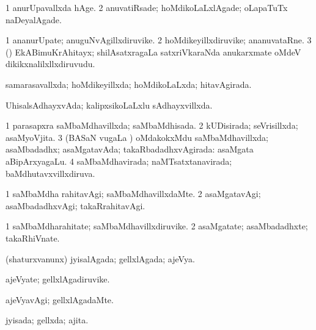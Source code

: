 {\bentry
{} 
\gl{\kirxvi}
\expl{}
\bmng
\bnum
\num{1} anurUpavallxda hAge. 
\num{2} anuvatiRsade; hoMdikoLaLxlAgade; oLapaTuTx naDeyalAgade. 
\enum
\emng
\eentry

\bentry
{} 
\gl{\nA}
\expl{}
\bmng
\bnum
\num{1} ananurUpate; anuguNvAgillxdiruvike. 
\num{2} hoMdikeyillxdiruvike; ananuvataRne. 
\num{3} (\BUvi) EkABimuKrAhitayx; shilAsatxragaLa satxriVkaraNda anukarxmate oMdeV dikikxnalilxllxdiruvudu. 
\enum
\emng
\eentry

\bentry
{} 
\gl{\gu}
\expl{}
\bmng
 samarasavallxda; hoMdikeyillxda; hoMdikoLaLxda; hitavAgirada. 
\emng
\eentry

\bentry
{} 
\gl{\gu}
\expl{}
\bmng
UhisalsAdhayxvAda; kalipxsikoLaLxlu sAdhayxvillxda. 
\emng
\eentry

\bentry
{} 
\gl{\gu}
\expl{}
\bmng
\bnum
\num{1} parasapxra saMbaMdhavillxda; saMbaMdhisada. 
\num{2} kUDisirada; seVrisillxda; asaMyoVjita. 
\num{3} (BASaN \mo vugaLa \vi) oMdakokxMdu saMbaMdhavillxda; asaMbadadhx; asaMgatavAda; takaRbadadhxvAgirada:  asaMgata aBipArxyagaLu. 
\num{4} saMbaMdhavirada; naMTsatxtanavirada; baMdhutavxvillxdiruva. 
\enum
\emng
\eentry

\bentry
{} 
\gl{\kirxvi}
\expl{}
\bmng
\bnum
\num{1} saMbaMdha rahitavAgi; saMbaMdhavillxdaMte. 
\num{2} asaMgatavAgi; asaMbadadhxvAgi; takaRrahitavAgi. 
\enum
\emng
\eentry


\bentry
{} 
\gl{\nA}
\expl{}
\bmng
\bnum
\num{1} saMbaMdharahitate; saMbaMdhavillxdiruvike. 
\num{2} asaMgatate; asaMbadadhxte; takaRhiVnate. 
\enum
\emng
\eentry

\bentry
{} 
\gl{\gu}
\expl{}
\bmng
 (shaturxvanunx) jyisalAgada; gellxlAgada; ajeVya. 
\emng
\eentry

\bentry
{} 
\gl{\nA}
\expl{}
\bmng
 ajeVyate; gellxlAgadiruvike. 
\emng
\eentry

\bentry
{} 
\gl{\kirxvi}
\expl{}
\bmng
 ajeVyavAgi; gellxlAgadaMte. 
\emng
\eentry

\bentry
{} 
\gl{\gu}
\expl{}
\bmng
 jyisada; gellxda; ajita. 
\emng
\eentry

}
